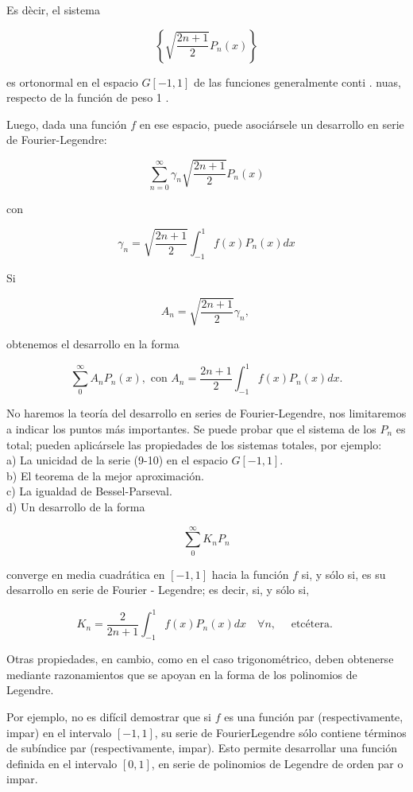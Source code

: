 \documentclass[10pt]{article}
\theoremstyle{plain}
\theoremstyle{definition}
\theoremstyle{remark}
\begin{document}
Es dècir, el sistema

$$
\left\{\sqrt{\frac{2 n+1}{2}} P_{n}(x)\right\}
$$

es ortonormal en el espacio $G[-1,1]$ de las funciones generalmente conti . nuas, respecto de la función de peso 1 .

Luego, dada una función $f$ en ese espacio, puede asociársele un desarrollo en serie de Fourier-Legendre:

$$
\sum_{n=0}^{\infty} \gamma_{n} \sqrt{\frac{2 n+1}{2}} P_{n}(x)
$$

con

$$
\gamma_{n}=\sqrt{\frac{2 n+1}{2}} \int_{-1}^{1} f(x) P_{n}(x) d x
$$

Si

$$
A_{n}=\sqrt{\frac{2 n+1}{2}} \gamma_{n} \text {, }
$$

obtenemos el desarrollo en la forma


\begin{equation*}
\sum_{0}^{\infty} A_{n} P_{n}(x), \text { con } A_{n}=\frac{2 n+1}{2} \int_{-1}^{1} f(x) P_{n}(x) d x . \tag{9-10}
\end{equation*}


No haremos la teoría del desarrollo en series de Fourier-Legendre, nos limitaremos a indicar los puntos más importantes. Se puede probar que el sistema de los $P_{n}$ es total; pueden aplicársele las propiedades de los sistemas totales, por ejemplo:\\
a) La unicidad de la serie (9-10) en el espacio $G[-1,1]$.\\
b) El teorema de la mejor aproximación.\\
c) La igualdad de Bessel-Parseval.\\
d) Un desarrollo de la forma

$$
\sum_{0}^{\infty} K_{n} P_{n}
$$

converge en media cuadrática en $[-1,1]$ hacia la función $f$ si, y sólo si, es su desarrollo en serie de Fourier - Legendre; es decir, si, y sólo si,

$$
K_{n}=\frac{2}{2 n+1} \int_{-1}^{1} f(x) P_{n}(x) d x \quad \forall n, \quad \text { etcétera. }
$$

Otras propiedades, en cambio, como en el caso trigonométrico, deben obtenerse mediante razonamientos que se apoyan en la forma de los polinomios de Legendre.

Por ejemplo, no es difícil demostrar que si $f$ es una función par (respectivamente, impar) en el intervalo $[-1,1]$, su serie de FourierLegendre sólo contiene términos de subíndice par (respectivamente, impar). Esto permite desarrollar una función definida en el intervalo $[0,1]$, en serie de polinomios de Legendre de orden par o impar.
\end{document}
